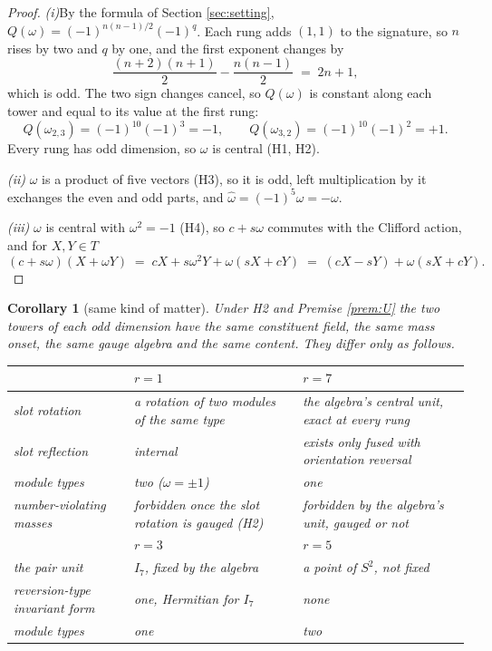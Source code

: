 \documentclass[11pt]{article}
\newtheorem{corollary}[theorem]{Corollary}
\theoremstyle{definition}
\newcommand{\pitem}[1]{\par\smallskip\noindent\textit{#1}\enspace}
\begin{document}
\begin{proof}
\textit{(i)}\enspace By the formula of Section \ref{sec:setting}, $Q(\omega) = (-1)^{n(n-1)/2}(-1)^{q}$. Each rung adds $(1,1)$ to the signature, so $n$ rises by two and $q$ by one, and the first exponent changes by
\[
\frac{(n+2)(n+1)}{2} - \frac{n(n-1)}{2} \;=\; 2n + 1,
\]
which is odd. The two sign changes cancel, so $Q(\omega)$ is constant along each tower and equal to its value at the first rung:
\[
Q(\omega_{2,3}) = (-1)^{10}(-1)^{3} = -1, \qquad Q(\omega_{3,2}) = (-1)^{10}(-1)^{2} = +1.
\]
Every rung has odd dimension, so $\omega$ is central (H1, H2).

\pitem{(ii)} $\omega$ is a product of five vectors (H3), so it is odd, left multiplication by it exchanges the even and odd parts, and $\hat{\omega} = (-1)^{5}\omega = -\omega$.

\pitem{(iii)} $\omega$ is central with $\omega^{2} = -1$ (H4), so $c + s\omega$ commutes with the Clifford action, and for $X, Y \in T$
\[
(c + s\omega)(X + \omega Y) \;=\; cX + s\omega^{2}Y + \omega(sX + cY) \;=\; (cX - sY) + \omega(sX + cY).
\]
\end{proof}

\begin{corollary}[same kind of matter]\label{cor:samekind}
Under H2 and Premise \ref{prem:U} the two towers of each odd dimension have the same constituent field, the same mass onset, the same gauge algebra and the same content. They differ only as follows.
\begin{center}\small
\begin{tabular}{@{}p{3.6cm}p{4.9cm}p{4.9cm}@{}}
\toprule
 & $r = 1$ & $r = 7$ \\
\midrule
slot rotation & a rotation of two modules of the same type & the algebra's central unit, exact at every rung \\
slot reflection & internal & exists only fused with orientation reversal \\
module types & two ($\omega = \pm 1$) & one \\
number-violating masses & forbidden once the slot rotation is gauged (H2) & forbidden by the algebra's unit, gauged or not \\
\midrule
 & $r = 3$ & $r = 5$ \\
\midrule
the pair unit & $I_{7}$, fixed by the algebra & a point of $S^{2}$, not fixed \\
reversion-type invariant form & one, Hermitian for $I_{7}$ & none \\
module types & one & two \\
\bottomrule
\end{tabular}
\end{center}
\end{corollary}
\end{document}
